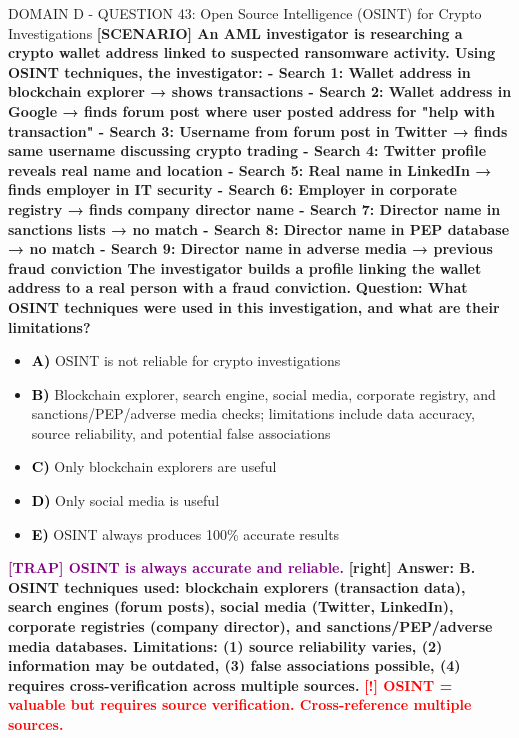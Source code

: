 \documentclass[11pt,a4paper]{beamer}
\newcommand{\redflag}[1]{\textcolor{red}{\textbf{[!] #1}}}
\newcommand{\trap}[1]{\textcolor{purple}{\textbf{[TRAP] #1}}}
\newcommand{\correct}[1]{\textcolor{green!50!black}{\textbf{[right] #1}}}
\newcommand{\scenario}[1]{\textcolor{blue!70!black}{\textbf{[SCENARIO] #1}}}
\newcommand{\option}[1]{\textcolor{black}{\textbf{#1}}}
\begin{document}
\begin{frame}{DOMAIN D - QUESTION 43: Open Source Intelligence (OSINT) for Crypto Investigations}
\scenario{An AML investigator is researching a crypto wallet address linked to suspected ransomware activity. Using OSINT techniques, the investigator:
- Search 1: Wallet address in blockchain explorer → shows transactions
- Search 2: Wallet address in Google → finds forum post where user posted address for "help with transaction"
- Search 3: Username from forum post in Twitter → finds same username discussing crypto trading
- Search 4: Twitter profile reveals real name and location
- Search 5: Real name in LinkedIn → finds employer in IT security
- Search 6: Employer in corporate registry → finds company director name
- Search 7: Director name in sanctions lists → no match
- Search 8: Director name in PEP database → no match
- Search 9: Director name in adverse media → previous fraud conviction
The investigator builds a profile linking the wallet address to a real person with a fraud conviction.}
\vspace{0.2cm}
\textbf{Question: What OSINT techniques were used in this investigation, and what are their limitations?}
\vspace{0.1cm}
\begin{itemize}
    \item \option{A)} OSINT is not reliable for crypto investigations
    \item \option{B)} Blockchain explorer, search engine, social media, corporate registry, and sanctions/PEP/adverse media checks; limitations include data accuracy, source reliability, and potential false associations
    \item \option{C)} Only blockchain explorers are useful
    \item \option{D)} Only social media is useful
    \item \option{E)} OSINT always produces 100\% accurate results
\end{itemize}
\vspace{0.2cm}
\trap{OSINT is always accurate and reliable.}
\correct{Answer: B. OSINT techniques used: blockchain explorers (transaction data), search engines (forum posts), social media (Twitter, LinkedIn), corporate registries (company director), and sanctions/PEP/adverse media databases. Limitations: (1) source reliability varies, (2) information may be outdated, (3) false associations possible, (4) requires cross-verification across multiple sources.}
\redflag{OSINT = valuable but requires source verification. Cross-reference multiple sources.}
\end{frame}
\end{document}

